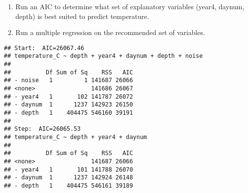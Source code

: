 \documentclass[
]{article}
\newenvironment{Shaded}{\begin{snugshade}}{\end{snugshade}}
\newcommand{\AttributeTok}[1]{\textcolor[rgb]{0.77,0.63,0.00}{#1}}
\newcommand{\CommentTok}[1]{\textcolor[rgb]{0.56,0.35,0.01}{\textit{#1}}}
\newcommand{\FunctionTok}[1]{\textcolor[rgb]{0.00,0.00,0.00}{#1}}
\newcommand{\NormalTok}[1]{#1}
\newcommand{\OtherTok}[1]{\textcolor[rgb]{0.56,0.35,0.01}{#1}}
\newcommand{\SpecialCharTok}[1]{\textcolor[rgb]{0.00,0.00,0.00}{#1}}
\begin{document}
\begin{enumerate}
\def\labelenumi{\arabic{enumi}.}
\setcounter{enumi}{8}
\item
  Run an AIC to determine what set of explanatory variables (year4,
  daynum, depth) is best suited to predict temperature.
\item
  Run a multiple regression on the recommended set of variables.
\end{enumerate}

\begin{Shaded}
\end{Shaded}

\begin{verbatim}
## Start:  AIC=26067.46
## temperature_C ~ depth + year4 + daynum + depth + noise
## 
##          Df Sum of Sq    RSS   AIC
## - noise   1         1 141687 26066
## <none>                141686 26067
## - year4   1       102 141787 26072
## - daynum  1      1237 142923 26150
## - depth   1    404475 546160 39191
## 
## Step:  AIC=26065.53
## temperature_C ~ depth + year4 + daynum
## 
##          Df Sum of Sq    RSS   AIC
## <none>                141687 26066
## - year4   1       101 141788 26070
## - daynum  1      1237 142924 26148
## - depth   1    404475 546161 39189
\end{verbatim}
\end{document}
